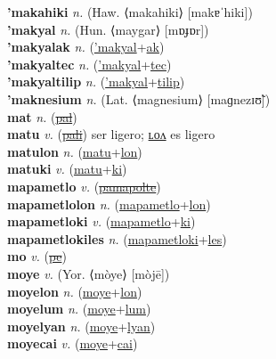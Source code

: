 \textbf{'makahiki} \textit{n.} (Haw. ⟨makahiki⟩ [makɐˈhiki])
 \label{'makahiki} \\
\textbf{'makyal} \textit{n.} (Hun. ⟨maygar⟩ [mɒɟɒr])
 \label{'makyal} \\
\textbf{'makyalak} \textit{n.} (\hyperref['makyal]{'makyal}+\hyperref[ak]{ak})
 \label{'makyalak} \\
\textbf{'makyaltec} \textit{n.} (\hyperref['makyal]{'makyal}+\hyperref[tec]{tec})
 \label{'makyaltec} \\
\textbf{'makyaltilip} \textit{n.} (\hyperref['makyal]{'makyal}+\hyperref[tilip]{tilip})
 \label{'makyaltilip} \\
\textbf{'maknesium} \textit{n.} (Lat. ⟨magnesium⟩ [maɡnezɪʊ̃])
 \label{'maknesium} \\
\textbf{mat} \textit{n.} (\hyperref[pal]{\sout{pal}})
 \label{mat} \\
\textbf{matu} \textit{v.} (\hyperref[pali]{\sout{pali}})
ser ligero; \hyperref[matulon]{ʟᴏᴧ} es ligero \label{matu} \\
\textbf{matulon} \textit{n.} (\hyperref[matu]{matu}+\hyperref[lon]{lon})
 \label{matulon} \\
\textbf{matuki} \textit{v.} (\hyperref[matu]{matu}+\hyperref[ki]{ki})
 \label{matuki} \\
\textbf{mapametlo} \textit{v.} (\hyperref[pamapolte]{\sout{pamapolte}})
 \label{mapametlo} \\
\textbf{mapametlolon} \textit{n.} (\hyperref[mapametlo]{mapametlo}+\hyperref[lon]{lon})
 \label{mapametlolon} \\
\textbf{mapametloki} \textit{v.} (\hyperref[mapametlo]{mapametlo}+\hyperref[ki]{ki})
 \label{mapametloki} \\
\textbf{mapametlokiles} \textit{n.} (\hyperref[mapametloki]{mapametloki}+\hyperref[les]{les})
 \label{mapametlokiles} \\
\textbf{mo} \textit{v.} (\hyperref[pe]{\sout{pe}})
 \label{mo} \\
\textbf{moye} \textit{v.} (Yor. ⟨mòye⟩ [mòjē])
 \label{moye} \\
\textbf{moyelon} \textit{n.} (\hyperref[moye]{moye}+\hyperref[lon]{lon})
 \label{moyelon} \\
\textbf{moyelum} \textit{n.} (\hyperref[moye]{moye}+\hyperref[lum]{lum})
 \label{moyelum} \\
\textbf{moyelyan} \textit{n.} (\hyperref[moye]{moye}+\hyperref[lyan]{lyan})
 \label{moyelyan} \\
\textbf{moyecai} \textit{v.} (\hyperref[moye]{moye}+\hyperref[cai]{cai})
